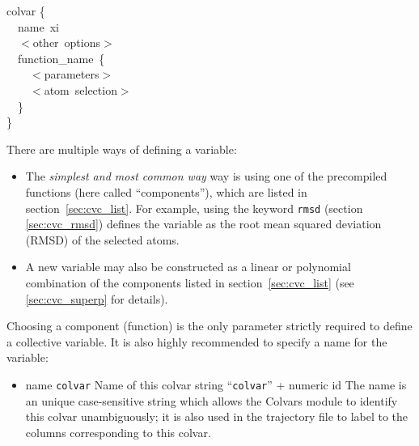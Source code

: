 \begin{cvexampleinput}
\-colvar \{\\
\-~~name~xi\\
\-~~$<$other~options$>$\\
\-~~function\_name~\{\\
\-~~~~$<$parameters$>$\\
\-~~~~$<$atom~selection$>$\\
\-~~\}\\
\}
\end{cvexampleinput}


\noindent{}There are multiple ways of defining a variable:
\begin{itemize}
\item The \emph{simplest and most common way} way is using one of the precompiled functions (here called ``components''), which are listed in section~\ref{sec:cvc_list}.  For example, using the keyword \texttt{rmsd} (section \ref{sec:cvc_rmsd}) defines the variable as the root mean squared deviation (RMSD) of the selected atoms.
\item A new variable may also be constructed as a linear or polynomial combination of the components listed in section~\ref{sec:cvc_list} (see \ref{sec:cvc_superp} for details).
\end{itemize}
Choosing a component (function) is the only parameter strictly required to define a collective variable.
It is also highly recommended to specify a name for the variable:
\begin{itemize}
\label{sec:colvar_general}
\item %
  \keydef
    {name}{%
    \texttt{colvar}}{%
    Name of this colvar}{%
    string}{%
    ``\texttt{colvar}'' + numeric id}{%
    The name is an unique case-sensitive string which allows the
    Colvars module to identify this colvar unambiguously; it is also
    used in the trajectory file to label to the columns corresponding
    to this colvar.}

\end{itemize}


